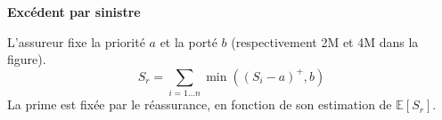 \begin{f}
\textbf{Excédent par sinistre}
	
L'assureur fixe la priorité $a$ et la porté $b$ (respectivement 2M\EUR{} et  4M\EUR{} dans la figure).
$$
S_r= \sum_{i=1\ldots n} \min\left( \left( S_i-a\right)^+,b\right)  
$$
La prime est fixée par le réassurance, en fonction de son estimation de $\mathbb{E}[S_r]$.


\end{f}
